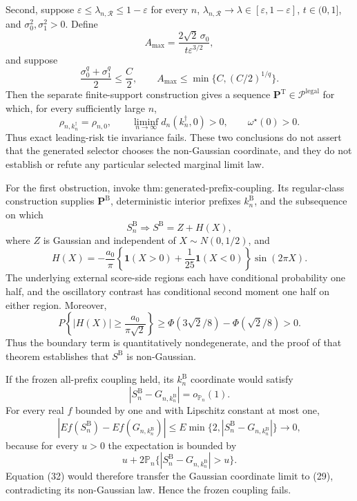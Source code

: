 Second, suppose \(\varepsilon\leq\lambda_{n,\mathcal R}\leq1-\varepsilon\) for every \(n\), \(\lambda_{n,\mathcal R}\to\lambda\in[\varepsilon,1-\varepsilon]\), \(t\in(0,1]\), and \(\sigma_0^2,\sigma_1^2>0\).  Define
\[
 A_{\max}=\frac{2\sqrt2\,\sigma_0}{t\varepsilon^{3/2}},
\]
and suppose
\[
 \frac{\sigma_0^q+\sigma_1^q}{2}\leq\frac C2,
 \qquad
 A_{\max}\leq\min\{C,(C/2)^{1/q}\}.
\]
Then the separate finite-support construction gives a sequence \(\mathbf P^{\mathrm T}\in\mathcal P^{\mathrm{legal}}\) for which, for every sufficiently large \(n\),
\[
 \rho_{n,k_n^{\dagger}}=\rho_{n,0},
 \qquad
 \liminf_{n\to\infty}d_n(k_n^{\dagger},0)>0,
 \qquad
 \omega^{\star}(0)>0.
\]
Thus exact leading-risk tie invariance fails.  These two conclusions do not assert that the generated selector chooses the non-Gaussian coordinate, and they do not establish or refute any particular selected marginal limit law.

For the first obstruction, invoke \(\mathrm{thm:generated\text{-}prefix\text{-}coupling}\).  Its regular-class construction supplies \(\mathbf P^{\mathrm B}\), deterministic interior prefixes \(k_n^{\mathrm B}\), and the subsequence on which
\[
 S_n^{\mathrm B}\Rightarrow S^{\mathrm B}=Z+H(X),
\tag{29}
\]
where \(Z\) is Gaussian and independent of \(X\sim N(0,1/2)\), and
\[
 H(X)=-\frac{a_0}{\pi}
 \left\{\mathbf1(X>0)+\frac1{25}\mathbf1(X<0)\right\}
 \sin(2\pi X).
\tag{30}
\]
The underlying external score-side regions each have conditional probability one half, and the oscillatory contrast has conditional second moment one half on either region.  Moreover,
\[
 P\left\{|H(X)|\geq\frac{a_0}{\pi\sqrt2}\right\}
 \geq\Phi(3\sqrt2/8)-\Phi(\sqrt2/8)>0.
\tag{31}
\]
Thus the boundary term is quantitatively nondegenerate, and the proof of that theorem establishes that \(S^{\mathrm B}\) is non-Gaussian.

If the frozen all-prefix coupling held, its \(k_n^{\mathrm B}\) coordinate would satisfy
\[
 |S_n^{\mathrm B}-G_{n,k_n^{\mathrm B}}|=o_{\mathbb P_n}(1).
\tag{32}
\]
For every real \(f\) bounded by one and with Lipschitz constant at most one,
\[
 |E f(S_n^{\mathrm B})-E f(G_{n,k_n^{\mathrm B}})|
 \leq E\min\{2,|S_n^{\mathrm B}-G_{n,k_n^{\mathrm B}}|\}\longrightarrow0,
\]
because for every \(u>0\) the expectation is bounded by
\[
 u+2\mathbb P_n\{|S_n^{\mathrm B}-G_{n,k_n^{\mathrm B}}|>u\}.
\]
Equation (32) would therefore transfer the Gaussian coordinate limit to (29), contradicting its non-Gaussian law.  Hence the frozen coupling fails.

